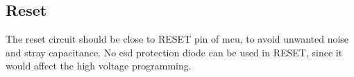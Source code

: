 \subsection{Reset}
	The reset circuit should be close to RESET pin of \gls{mcu}, to avoid unwanted noise and stray capacitance. No \gls{esd} protection diode can be used in RESET, since it would affect the high voltage programming.
